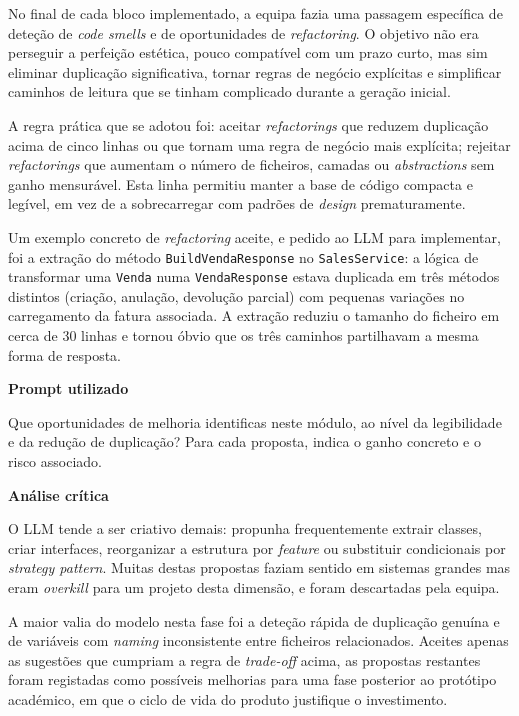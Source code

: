    No final de cada bloco implementado, a equipa fazia uma passagem específica de deteção de \textit{code smells} e de oportunidades de \textit{refactoring}. O objetivo não era perseguir a perfeição estética, pouco compatível com um prazo curto, mas sim eliminar duplicação significativa, tornar regras de negócio explícitas e simplificar caminhos de leitura que se tinham complicado durante a geração inicial.

    A regra prática que se adotou foi: aceitar \textit{refactorings} que reduzem duplicação acima de cinco linhas ou que tornam uma regra de negócio mais explícita; rejeitar \textit{refactorings} que aumentam o número de ficheiros, camadas ou \textit{abstractions} sem ganho mensurável. Esta linha permitiu manter a base de código compacta e legível, em vez de a sobrecarregar com padrões de \textit{design} prematuramente.

    Um exemplo concreto de \textit{refactoring} aceite, e pedido ao LLM para implementar, foi a extração do método \texttt{BuildVendaResponse} no \texttt{SalesService}: a lógica de transformar uma \texttt{Venda} numa \texttt{VendaResponse} estava duplicada em três métodos distintos (criação, anulação, devolução parcial) com pequenas variações no carregamento da fatura associada. A extração reduziu o tamanho do ficheiro em cerca de 30 linhas e tornou óbvio que os três caminhos partilhavam a mesma forma de resposta.

    \begin{tcolorbox}[title=Interação com o LLM]
    \textbf{Prompt utilizado}

    Que oportunidades de melhoria identificas neste módulo, ao nível da legibilidade e da redução de duplicação? Para cada proposta, indica o ganho concreto e o risco associado.

    \tcblower

    \textbf{Análise crítica}

    O LLM tende a ser criativo demais: propunha frequentemente extrair classes, criar interfaces, reorganizar a estrutura por \textit{feature} ou substituir condicionais por \textit{strategy pattern}. Muitas destas propostas faziam sentido em sistemas grandes mas eram \textit{overkill} para um projeto desta dimensão, e foram descartadas pela equipa.

    A maior valia do modelo nesta fase foi a deteção rápida de duplicação genuína e de variáveis com \textit{naming} inconsistente entre ficheiros relacionados. Aceites apenas as sugestões que cumpriam a regra de \textit{trade-off} acima, as propostas restantes foram registadas como possíveis melhorias para uma fase posterior ao protótipo académico, em que o ciclo de vida do produto justifique o investimento.
    \end{tcolorbox}

